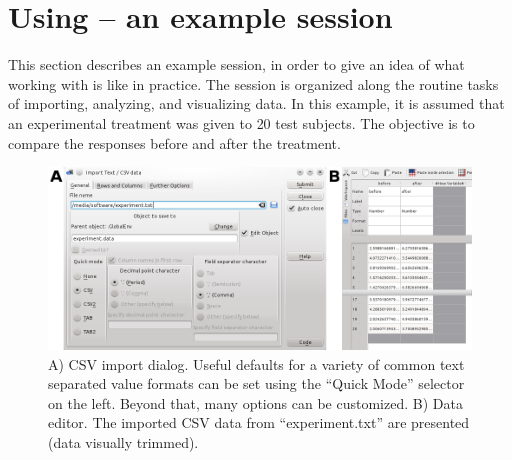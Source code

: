 \section[Using RKWard -- an example session]{Using  -- an example session}
\label{sec:using_RKWard}
This section describes an example  session, in order to give an idea
of what working with  is like in practice.
The session is organized along the routine tasks of importing,
analyzing, and visualizing data. In this example, it is assumed that an experimental
treatment was given to 20 test subjects. The objective is to compare the responses 
before and after the treatment. 

\medskip 
\begin{figure}[hb!]
 \centering
 \includegraphics[width=13.5cm]{./figures/import_data.png}
 \caption{A) CSV import dialog. Useful defaults for a variety of common text separated value formats can
  be set using the ``Quick Mode'' selector on the left. Beyond that, many options can be customized. B) Data editor. The imported CSV
  data from ``experiment.txt'' are presented (data visually trimmed).}
 \label{fig:import_data}
\end{figure}

